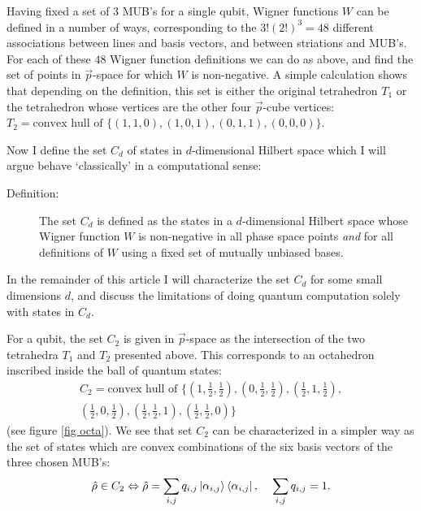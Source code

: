 \documentclass[aps,twocolumn,showpacs,nofootinbib,groupedaddress]{revtex4}
\begin{document}
Having fixed a set of 3 MUB's for a single qubit, Wigner functions
$W$ can be defined in a number of ways, corresponding to the
$3!(2!)^3=48$ different associations between lines and basis
vectors, and between striations and MUB's. For each of these $48$
Wigner function definitions we can do as above, and find the set
of points in $\vec{p}$-space for which $W$ is non-negative. A
simple calculation shows that depending on the definition, this
set is either the original tetrahedron $T_1$ or the tetrahedron
whose vertices are the other four $\vec{p}$-cube vertices:
$T_2=\text{convex hull of }\{(1,1,0),(1,0,1),(0,1,1),(0,0,0)\}$.

Now I define the set $C_d$ of states in $d$-dimensional Hilbert
space which I will argue behave `classically' in a computational
sense:

\begin{description}
\item[Definition:] The set $C_d$ is defined as the states in a $d$-dimensional Hilbert space whose Wigner function $W$ is non-negative in all phase space points \textit{and} for all definitions of $W$ using a fixed set of mutually unbiased bases.
\end{description}
In the remainder of this article I will characterize the set $C_d$
for some small dimensions $d$, and discuss the limitations of
doing quantum computation solely with states in $C_d$.

For a qubit, the set $C_2$ is given in $\vec{p}$-space as the
intersection of the two tetrahedra $T_1$ and $T_2$ presented
above. This corresponds to an octahedron inscribed inside the ball
of quantum states:
\begin{eqnarray}
 C_2=\text{convex hull of }\{(1,\frac{1}{2},\frac{1}{2}),(0,\frac{1}{2},\frac{1}{2}),(\frac{1}{2},1,\frac{1}{2}),\nonumber \\(\frac{1}{2},0,\frac{1}{2}),(\frac{1}{2},\frac{1}{2},1),(\frac{1}{2},\frac{1}{2},0)\}
\end{eqnarray}
(see figure \ref{fig octa}). We see that set $C_2$ can be
characterized in a simpler way as the set of states which are
convex combinations of the six basis vectors of the three chosen
MUB's:
\begin{equation}
\hat{\rho} \in {C_2} \Leftrightarrow \hat{\rho} =\sum_{i,j}q_{i,j}
\left|\alpha_{i,j}\right\rangle\left\langle\alpha_{i,j}\right|,
\hspace{4 mm }\sum_{i,j}q_{i,j}=1.
\end{equation}
\end{document}
